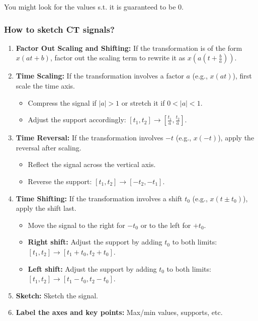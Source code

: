 \begin{warning}
    You might look for the values s.t. it is guaranteed to be 0.
\end{warning}

\subsubsection{How to sketch CT signals?}
\begin{process}
    \begin{enumerate}
        \item \textbf{Factor Out Scaling and Shifting:} If the transformation is of the form \( x(at + b) \), factor out the scaling term to rewrite it as \( x\left(a\left(t + \frac{b}{a}\right)\right) \).
    
        \item \textbf{Time Scaling:} If the transformation involves a factor \( a \) (e.g., \( x(at) \)), first scale the time axis.
        \begin{itemize}
            \item Compress the signal if \( |a| > 1 \) or stretch it if \( 0 < |a| < 1 \).
            \item Adjust the support accordingly: \( [t_1, t_2] \to \left[ \frac{t_1}{a}, \frac{t_2}{a} \right] \).
        \end{itemize}
        
        \item \textbf{Time Reversal:} If the transformation involves \( -t \) (e.g., \( x(-t) \)), apply the reversal after scaling.
        \begin{itemize}
            \item Reflect the signal across the vertical axis.
            \item Reverse the support: \( [t_1, t_2] \to [-t_2, -t_1] \).
        \end{itemize}
        
        \item \textbf{Time Shifting:} If the transformation involves a shift \( t_0 \) (e.g., \( x(t \pm t_0) \)), apply the shift last.
        \begin{itemize}
            \item Move the signal to the right for \(- t_0 \) or to the left for \(+ t_0 \).
            \item \textbf{Right shift:} Adjust the support by adding \( t_0 \) to both limits: \( [t_1, t_2] \to [t_1 + t_0, t_2 + t_0] \).
            \item \textbf{Left shift:} Adjust the support by adding \( t_0 \) to both limits: \( [t_1, t_2] \to [t_1 - t_0, t_2 - t_0] \).
        \end{itemize}

        \item \textbf{Sketch:} Sketch the signal. 
        \item \textbf{Label the axes and key points:} Max/min values, supports, etc.
    \end{enumerate}    
\end{process}

